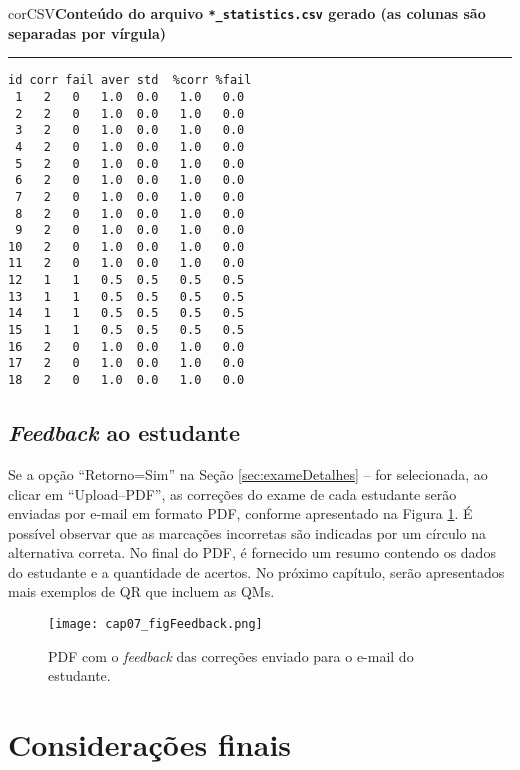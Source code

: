 \begin{myboxCode}{corCSV}{\textbf{Conteúdo do arquivo \texttt{*\_statistics.csv} gerado (as colunas são separadas por vírgula)}}\vspace{3mm}
\hrule
{\footnotesize
\begin{verbatim}
id corr fail aver std  %corr %fail
 1   2   0   1.0  0.0   1.0   0.0
 2   2   0   1.0  0.0   1.0   0.0
 3   2   0   1.0  0.0   1.0   0.0
 4   2   0   1.0  0.0   1.0   0.0
 5   2   0   1.0  0.0   1.0   0.0
 6   2   0   1.0  0.0   1.0   0.0
 7   2   0   1.0  0.0   1.0   0.0
 8   2   0   1.0  0.0   1.0   0.0
 9   2   0   1.0  0.0   1.0   0.0
10   2   0   1.0  0.0   1.0   0.0
11   2   0   1.0  0.0   1.0   0.0
12   1   1   0.5  0.5   0.5   0.5
13   1   1   0.5  0.5   0.5   0.5
14   1   1   0.5  0.5   0.5   0.5
15   1   1   0.5  0.5   0.5   0.5
16   2   0   1.0  0.0   1.0   0.0
17   2   0   1.0  0.0   1.0   0.0
18   2   0   1.0  0.0   1.0   0.0
\end{verbatim}
}
\end{myboxCode}

\subsection{\textit{Feedback} ao estudante}


Se a opção ``Retorno=Sim'' na Seção \ref{sec:exameDetalhes} --  for selecionada, ao clicar em ``Upload--PDF'', as correções do exame de cada estudante serão enviadas por e-mail em formato PDF, conforme apresentado na Figura \ref{fig:cap07_figFeedback}. É possível observar que as marcações incorretas são indicadas por um círculo na alternativa correta. No final do PDF, é fornecido um resumo contendo os dados do estudante e a quantidade de acertos. No próximo capítulo, serão apresentados mais exemplos de QR que incluem as QMs.

\begin{figure}[htbp]
  \centering
  \texttt{[image: cap07\_figFeedback.png]}
    \caption{PDF com o \textit{feedback} das correções enviado para o e-mail do estudante.}
\label{fig:cap07_figFeedback}
\end{figure}



\section{Considerações finais}

